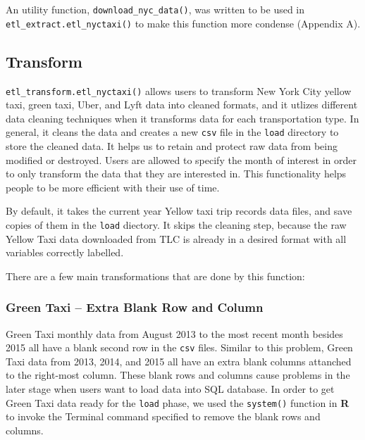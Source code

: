 \documentclass[12pt,twoside]{reedthesis}
\newenvironment{Shaded}{\begin{snugshade}}{\end{snugshade}}
\newcommand{\KeywordTok}[1]{\textcolor[rgb]{0.13,0.29,0.53}{\textbf{#1}}}
\newcommand{\DataTypeTok}[1]{\textcolor[rgb]{0.13,0.29,0.53}{#1}}
\newcommand{\DecValTok}[1]{\textcolor[rgb]{0.00,0.00,0.81}{#1}}
\newcommand{\StringTok}[1]{\textcolor[rgb]{0.31,0.60,0.02}{#1}}
\newcommand{\OperatorTok}[1]{\textcolor[rgb]{0.81,0.36,0.00}{\textbf{#1}}}
\newcommand{\NormalTok}[1]{#1}
\theoremstyle{definition}
\theoremstyle{definition}
\theoremstyle{definition}
\theoremstyle{remark}
\begin{document}
An utility function, \texttt{download\_nyc\_data()}, was written to be
used in \texttt{etl\_extract.etl\_nyctaxi()} to make this function more
condense (Appendix A).

\subsection{Transform}\label{transform}

\texttt{etl\_transform.etl\_nyctaxi()} allows users to transform New
York City yellow taxi, green taxi, Uber, and Lyft data into cleaned
formats, and it utlizes different data cleaning techniques when it
transforms data for each transportation type. In general, it cleans the
data and creates a new \texttt{csv} file in the \texttt{load} directory
to store the cleaned data. It helps us to retain and protect raw data
from being modified or destroyed. Users are allowed to specify the month
of interest in order to only transform the data that they are interested
in. This functionality helps people to be more efficient with their use
of time.

By default, it takes the current year Yellow taxi trip records data
files, and save copies of them in the \texttt{load} diectory. It skips
the cleaning step, because the raw Yellow Taxi data downloaded from TLC
is already in a desired format with all variables correctly labelled.
\begin{Shaded}
\end{Shaded}
There are a few main transformations that are done by this function:

\subsubsection{Green Taxi -- Extra Blank Row and
Column}\label{green-taxi-extra-blank-row-and-column}

Green Taxi monthly data from August 2013 to the most recent month
besides 2015 all have a blank second row in the \texttt{csv} files.
Similar to this problem, Green Taxi data from 2013, 2014, and 2015 all
have an extra blank columns attanched to the right-most column. These
blank rows and columns cause problems in the later stage when users want
to load data into SQL database. In order to get Green Taxi data ready
for the \texttt{load} phase, we used the \texttt{system()} function in
\textbf{R} to invoke the Terminal command specified to remove the blank
rows and columns.
\end{document}
